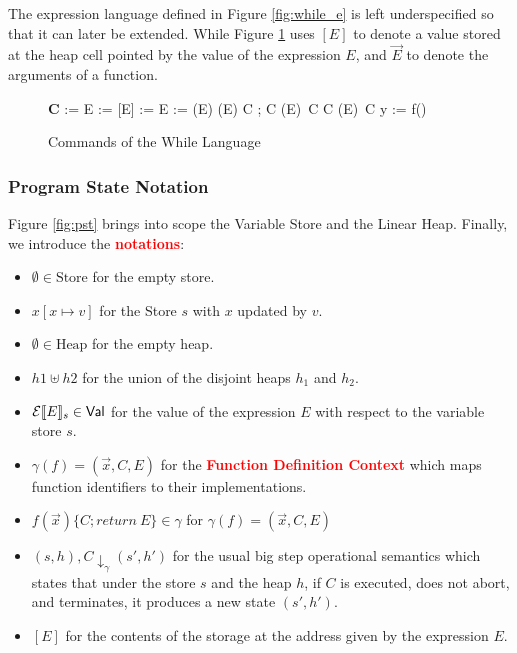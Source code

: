 \documentclass[11pt]{article}
\newcommand{\Val}{\mathsf{Val}}
\begin{document}
The expression language defined in Figure \ref{fig:while_e} is left underspecified so that it can later be extended. While Figure \ref{fig:while_c} uses $[E]$ to denote a value stored at the heap cell pointed by the value of the expression $E$, and $\vec{E}$ to denote the arguments of a function.

\begin{figure}[H]
\label{fig:while_c}
\centering
\begin{grammar}{\textbf{C}}
   := E                      \alt
   := [E]                        \alt
  [E] := E                               \alt
   := (E)          \alt
  (E)                  \alt
                                  \alt
  C ; C                             \alt
   (E)\ C  C            \alt
   (E)\ C                      \alt
  y := f()                  
\end{grammar}
\caption{Commands of the While Language}
\end{figure}


\subsubsection*{Program State Notation}

Figure \ref{fig:pst} brings into scope the Variable Store and the Linear Heap. Finally, we introduce the \textbf{\textcolor{red}{notations}}:

\begin{itemize}
	\item $\emptyset \in \text{Store}$ for the empty store.
	\item $x[x \mapsto v]$ for the Store $s$ with $x$ updated by $v$.\\
	\item $\emptyset \in \text{Heap}$ for the empty heap.
	\item $h1 \uplus h2$ for the union of the disjoint heaps $h_1$ and $h_2$.
	\item $\mathcal{E}\denotation{E}_{s} \in \Val$ for the value of the expression $E$ with respect to the variable store $s$.
	\item $\gamma(f) = (\vec{x},C,E)$ for the \textbf{\textcolor{red}{Function Definition Context}} which maps function identifiers to their implementations.
	\item $f(\vec{x})\{C;return\ E\} \in \gamma$ for $\gamma(f) = (\vec{x},C,E)$
	\item $(s,h),C \downarrow_\gamma (s',h')$ for the usual big step operational semantics which states that under the store $s$ and the heap $h$, if $C$ is executed, does not abort, and terminates, it produces a new state $(s',h')$.
	\item $[E]$ for the contents of the storage at the address given by the expression $E$.
\end{itemize}
\end{document}
